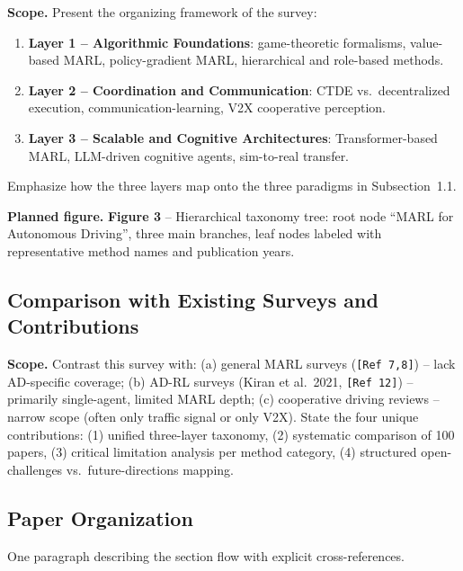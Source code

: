 \documentclass[12pt, a4paper]{article}
\begin{document}
\begin{outline_note}
\textbf{Scope.}
Present the organizing framework of the survey:
\begin{enumerate}[nosep]
  \item \textbf{Layer 1 -- Algorithmic Foundations}: game-theoretic formalisms,
        value-based MARL, policy-gradient MARL, hierarchical and role-based methods.
  \item \textbf{Layer 2 -- Coordination and Communication}: CTDE vs.\ decentralized
        execution, communication-learning, V2X cooperative perception.
  \item \textbf{Layer 3 -- Scalable and Cognitive Architectures}:
        Transformer-based MARL, LLM-driven cognitive agents, sim-to-real transfer.
\end{enumerate}
Emphasize how the three layers map onto the three paradigms in
Subsection~1.1.

\textbf{Planned figure.}
\textbf{Figure 3} -- Hierarchical taxonomy tree: root node
``MARL for Autonomous Driving'', three main branches, leaf nodes labeled with
representative method names and publication years.
\end{outline_note}

\subsection{Comparison with Existing Surveys and Contributions}

\begin{outline_note}
\textbf{Scope.}
Contrast this survey with:
(a) general MARL surveys (\texttt{[Ref\,7,8]}) -- lack AD-specific coverage;
(b) AD-RL surveys (Kiran et al.\ 2021, \texttt{[Ref\,12]}) -- primarily
single-agent, limited MARL depth;
(c) cooperative driving reviews -- narrow scope (often only traffic signal or only
V2X).
State the four unique contributions: (1) unified three-layer taxonomy,
(2) systematic comparison of 100 papers, (3) critical limitation analysis per method
category, (4) structured open-challenges vs.\ future-directions mapping.
\end{outline_note}

\subsection{Paper Organization}

\begin{outline_note}
One paragraph describing the section flow with explicit cross-references.
\end{outline_note}
\end{document}

